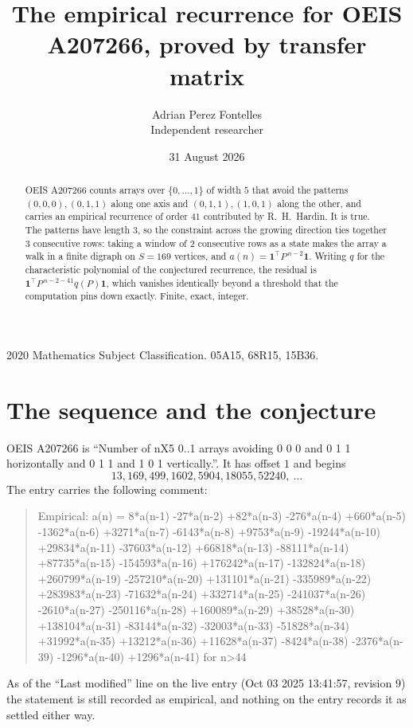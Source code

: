 \documentclass[11pt,a4paper]{article}
\title{The empirical recurrence for OEIS A207266, proved by transfer matrix}
\author{Adrian Perez Fontelles\\ \small Independent researcher}
\date{31 August 2026}
\theoremstyle{plain}
\theoremstyle{definition}
\begin{document}
\maketitle

\begin{abstract}
OEIS A207266 counts arrays over $\{0,\dots,1\}$ of width $5$ that avoid the patterns
$(0,0,0), (0,1,1)$ along one axis and $(0,1,1), (1,0,1)$ along the other, and carries an empirical recurrence of
order $41$ contributed by R.~H.~Hardin. It is true. The patterns have length $3$, so
the constraint across the growing direction ties together $3$ consecutive rows: taking a
window of $2$ consecutive rows as a state makes the array a walk in a finite digraph
on $S=169$ vertices, and $a(n)=\mathbf{1}^{\!\top}P^{\,n-2}\mathbf{1}$. Writing $q$
for the characteristic polynomial of the conjectured recurrence, the residual is
$\mathbf{1}^{\!\top}P^{\,n-2-41}q(P)\mathbf{1}$, which vanishes identically
beyond a threshold that the computation pins down exactly. Finite, exact, integer.
\end{abstract}

\noindent\small 2020 Mathematics Subject Classification. 05A15, 68R15, 15B36.\normalsize

\section{The sequence and the conjecture}

OEIS A207266 is ``Number of nX5 0..1 arrays avoiding 0 0 0 and 0 1 1 horizontally and 0 1 1 and 1 0 1 vertically.''. It has offset
$1$ and begins
\[
13, 169, 499, 1602, 5904, 18055, 52240,\ \dots
\]
The entry carries the following comment:
\begin{quote}\small
Empirical: a(n) = 8*a(n-1) -27*a(n-2) +82*a(n-3) -276*a(n-4) +660*a(n-5) -1362*a(n-6) +3271*a(n-7) -6143*a(n-8) +9753*a(n-9) -19244*a(n-10) +29834*a(n-11) -37603*a(n-12) +66818*a(n-13) -88111*a(n-14) +87735*a(n-15) -154593*a(n-16) +176242*a(n-17) -132824*a(n-18) +260799*a(n-19) -257210*a(n-20) +131101*a(n-21) -335989*a(n-22) +283983*a(n-23) -71632*a(n-24) +332714*a(n-25) -241037*a(n-26) -2610*a(n-27) -250116*a(n-28) +160089*a(n-29) +38528*a(n-30) +138104*a(n-31) -83144*a(n-32) -32003*a(n-33) -51828*a(n-34) +31992*a(n-35) +13212*a(n-36) +11628*a(n-37) -8424*a(n-38) -2376*a(n-39) -1296*a(n-40) +1296*a(n-41) for n>44
\end{quote}
As of the ``Last modified'' line on the live entry (Oct 03 2025 13:41:57, revision
9) the statement is still recorded as empirical, and nothing on the entry
records it as settled either way.
\end{document}

